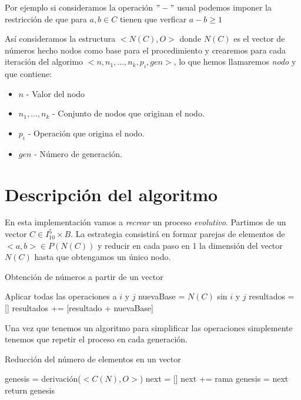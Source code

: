 \documentclass{article}
\begin{document}
Por ejemplo si consideramos la operación $"-"$ usual podemos imponer la
restricción de que para $a,b \in C$ tienen que verficar $a-b \ge 1$

Así consideramos la estructura $<N(C), O>$ donde $N(C)$ es el vector
de números hecho nodos como base para el procedimiento y crearemos
para cada iteración del algorimo
$<n, {n_1, ..., n_k} , p_i, gen>$, lo que hemos llamaremos
\textit{nodo} y que contiene:

\begin{itemize}
\item $n$ - Valor del nodo
\item ${n_1, ..., n_k}$ - Conjunto de nodos que originan el nodo.
\item $p_i$ - Operación que origina el nodo.
\item $gen$ - Número de generación.
\end{itemize}

\section{Descripción del algoritmo}

En esta implementación vamos a \textit{recrear} un proceso
\textit{evolutivo}.  Partimos de un vector
$C \in I_{10}^{5} \times B$. La estrategia consistirá en formar
parejas de elementos de $<a,b> \in P(N(C))$ y reducir en cada paso en
1 la dimensión del vector $N(C)$ hasta que obtengamos un único nodo.


\begin{algorithm}
\caption{Obtención de números a partir de un vector}
\label{Computo de los resultados posibles}
\begin{algorithmic}[1]
\State Aplicar todas las operaciones a $i$ y $j$
\State nuevaBase = $N(C)$ sin $i$ y $j$
\State resultados = []
\State resultados += [resultado + nuevaBase]
\EndFor
\EndFor
\EndProcedure
\end{algorithmic}
\end{algorithm}

Una vez que tenemos un algoritmo para simplificar las operaciones
simplemente tenemos que repetir el proceso en cada generación.

\begin{algorithm}
\caption{Reducción del número de elementos en un vector}
\label{Iteraciones sobre cada subrama}
\begin{algorithmic}[1]
\State genesis = derivación($<C(N), O>$)
\State next = []
\State next += rama
\EndFor
\EndFor
\State genesis = next
\EndFor
\State return genesis
\EndProcedure
\end{algorithmic}
\end{algorithm}
\end{document}

